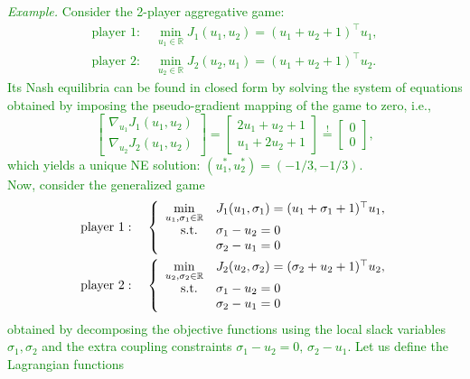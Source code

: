 \documentclass[11pt]{article}
\newcommand{\green}{\textcolor{green}}
\newcommand{\0}{\mathbf{0}}
\newcommand{\1}{\mathbf{1}}
\begin{document}
\green{
\textit{Example.} Consider the 2-player aggregative game:
\begin{align*} 
\text{player }1: \quad \min_{u_1 \in \mathbb R}J_1(u_1,u_2) = (u_1+u_2 + 1)^\top u_1,\\
\text{player }2: \quad \min_{u_2 \in \mathbb R} J_2(u_2,u_1) = (u_1+u_2 + 1)^\top u_2.
\end{align*}
Its Nash equilibria can be found in closed form by solving the system of equations obtained by imposing the pseudo-gradient mapping of the game to zero, i.e.,
\begin{equation*}
\left[
\begin{array}{l}
\nabla_{u_1} J_1(u_1,u_2)\\
\nabla_{u_2} J_2(u_1,u_2)
\end{array}
\right]
=
\left[
\begin{array}{l}
2u_1+u_2+1\\
u_1+2u_2+1
\end{array}
\right]
\overset{!}{=}
\left[
\begin{array}{l}
0\\
0
\end{array}
\right],
\end{equation*} 
which yields a unique NE solution: $(u_1^*,u_2^*) = (-1/3,-1/3) $.\\
Now, consider the generalized game
\begin{align*} \
\text{player }1: \quad 
\left\{
\begin{array}{r l}
\displaystyle
\min_{u_1,\sigma_1 \in \mathbb R}& J_1(u_1,\sigma_1) = (u_1+\sigma_1 + 1)^\top u_1,\\
\text{s.t. } & \sigma_1 - u_2 = 0\\
            &  \sigma_2 - u_1 = 0
\end{array}
\right.
\\
\text{player }2: \quad 
\left\{
\begin{array}{r l}
\displaystyle
\min_{u_2,\sigma_2 \in \mathbb R}& J_2(u_2,\sigma_2) = (\sigma_2+u_2 + 1)^\top u_2,\\
\text{s.t. } & \sigma_1 - u_2 = 0\\
            &  \sigma_2 - u_1 = 0
\end{array}
\right.
\end{align*} 
obtained by decomposing the objective functions using the local slack variables $\sigma_1,\sigma_2$ and the extra coupling constraints $\sigma_1 - u_2 = 0, \, \sigma_2 - u_1$. Let us define the Lagrangian functions
\begin{align*}

\end{align*}}
\end{document}

